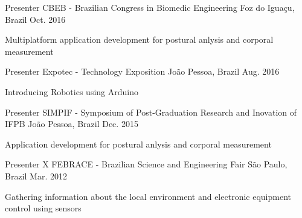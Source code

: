 \begin{cventries}
  \cventry
    {Presenter} %
    {CBEB - Brazilian Congress in Biomedic Engineering} %
    {Foz do Iguaçu, Brazil} %
    {Oct. 2016} %
    {
      \begin{cvitems} %
        \item {Multiplatform application development for postural anlysis and corporal measurement}
      \end{cvitems}
    }
  \cventry
    {Presenter} %
    {Expotec - Technology Exposition} %
    {João Pessoa, Brazil} %
    {Aug. 2016} %
    {
      \begin{cvitems} %
        \item {Introducing Robotics using Arduino}
      \end{cvitems}
    }
  \cventry
    {Presenter} %
    {SIMPIF - Symposium of Post-Graduation Research and Inovation of IFPB} %
    {João Pessoa, Brazil} %
    {Dec. 2015} %
    {
      \begin{cvitems} %
        \item {Application development for postural anlysis and corporal measurement}
      \end{cvitems}
    }
  \cventry
    {Presenter} %
    {X FEBRACE - Brazilian Science and Engineering Fair} %
    {São Paulo, Brazil} %
    {Mar. 2012} %
    {
      \begin{cvitems} %
        \item {Gathering information about the local environment and electronic equipment control using sensors}
      \end{cvitems}
    }
\end{cventries}
